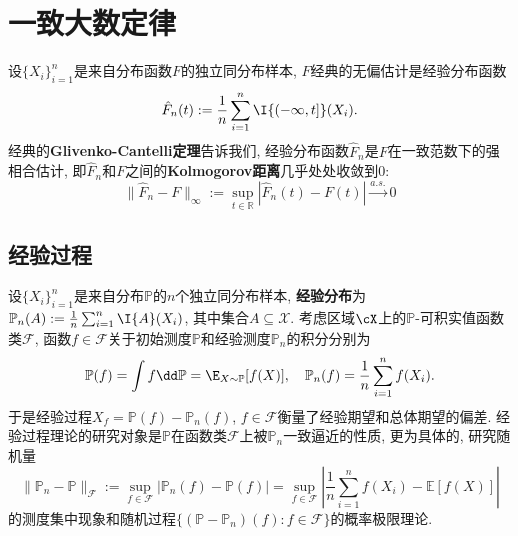 \section{一致大数定律}

%
 
设$\{X_i\}_{i=1}^n$是来自分布函数$F$的独立同分布样本, $F$经典的无偏估计是经验分布函数
\begin{equation*}
	\hat F_n(t) 
	:= \frac{1}{n} \sum_{i=1}^n \I{(-\infty, t]}(X_i). 
\end{equation*}
经典的\textbf{Glivenko-Cantelli定理}告诉我们, 经验分布函数$\hat F_n$是$F$在一致范数下的强相合估计, 即$\hat F_n$和$F$之间的\textbf{Kolmogorov距离}几乎处处收敛到$0$: 
\begin{equation*}
	\|\hat F_n - F\|_{\infty} 
	:= \sup_{t \in \mathbb{R}} |\hat F_n(t) - F(t)| \stackrel{a.s.}{\to} 0
\end{equation*}

%


\subsection{经验过程}

设$\{X_i\}_{i=1}^n$是来自分布$\mathbb{P}$的$n$个独立同分布样本, \textbf{经验分布}为$\mathbb{P}_n(A) := \frac{1}{n} \sum_{i=1}^n \I{A}(X_i)$, 其中集合$A \subseteq \mathcal{X}$. 
考虑区域$\cX$上的$\mathbb{P}$-可积实值函数类$\mathscr{F}$, 函数$f \in \mathscr{F}$关于初始测度$\mathbb{P}$和经验测度$\mathbb{P}_n$的积分分别为 
\begin{equation*}
	\mathbb{P}(f) = \int f \dd \mathbb{P} = \E_{X \sim \mathbb{P}} [f(X)], \quad
	\mathbb{P}_n(f) = \frac{1}{n} \sum_{i=1}^n f(X_i). 
\end{equation*}
于是经验过程$X_f = \mathbb{P}(f) - \mathbb{P}_n(f)$, $f \in \mathscr{F}$衡量了经验期望和总体期望的偏差. 
经验过程理论的研究对象是$\mathbb{P}$在函数类$\mathscr{F}$上被$\mathbb{P}_n$一致逼近的性质, 更为具体的, 研究随机量 
\begin{equation*}
	\|\mathbb{P}_n - \mathbb{P}\|_{\mathscr{F}} 
	:= \sup_{f \in\mathscr{F}} \left| \mathbb{P}_n(f) - \mathbb{P}(f) \right|
	= \sup_{f \in\mathscr{F}} \left| \frac{1}{n} \sum_{i=1}^n f(X_i) - \mathbb{E}[f(X)] \right|
\end{equation*}
的测度集中现象和随机过程$\{(\mathbb{P} - \mathbb{P}_n)(f) \colon f \in \mathscr{F}\}$的概率极限理论. 

